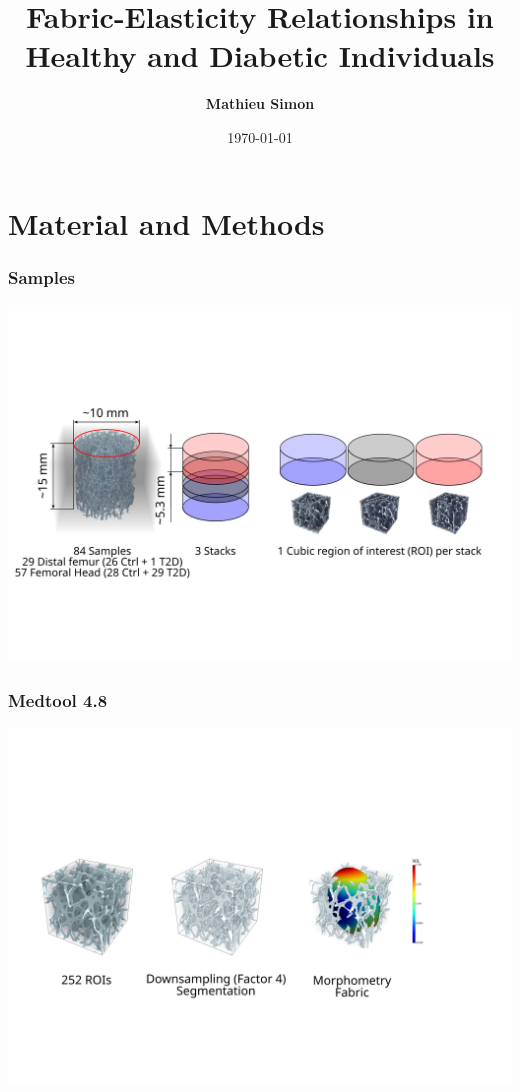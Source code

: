 \documentclass[xcolor=table,11pt]{beamer}
\title[DIAFAB]{Fabric-Elasticity Relationships in Healthy and Diabetic Individuals}
\author[mathieu.simon@unibe.ch]{\tiny{\bf{Mathieu Simon}}}
\date{\today}
\begin{document}
	
	\begin{frame}
		\titlepage
	\end{frame}
	
	
	\section{Material and Methods}

	\begin{frame}
		\frametitle{Samples}
		\includegraphics[width=\linewidth]{Pictures/Material}\\
	\end{frame}

	\begin{frame}
		\frametitle{Medtool 4.8}
		\includegraphics[width=\linewidth]{Pictures/Medtool}\\
	\end{frame}
\end{document}
